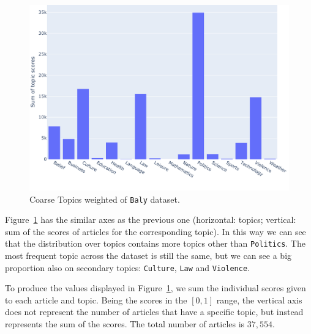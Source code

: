 \begin{figure}[!htbp]
    \centering
    \includegraphics[trim={0cm 1cm 0cm 0cm},clip,width=\linewidth]{figures/baly_coarse_weighted.pdf}
    \caption{Coarse Topics weighted of \texttt{Baly} dataset.}
    \label{fig:baly_coarse_weighted}
\end{figure}

Figure~\ref{fig:baly_coarse_weighted} has the similar axes as the previous one (horizontal: topics; vertical: sum of the scores of articles for the corresponding topic).
In this way we can see that the distribution over topics contains more topics other than \texttt{Politics}.
The most frequent topic across the dataset is still the same, but we can see a big proportion also on secondary topics: \texttt{Culture}, \texttt{Law} and \texttt{Violence}.

To produce the values displayed in Figure~\ref{fig:baly_coarse_weighted}, we sum the individual scores given to each article and topic. Being the scores in the $[0,1]$ range, the vertical axis does not represent the number of articles that have a specific topic, but instead represents the sum of the scores. The total number of articles is $37,554$.


